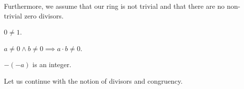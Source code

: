 \documentclass[english]{article}
\begin{document}
  Furthermore, we assume that our ring is not trivial and that there are no non-trivial zero
  divisors.

  \begin{forthel}
    \begin{axiom}\label{NonTriv}
      $0 \neq 1$.
    \end{axiom}

    \begin{axiom}\label{ZeroDiv}
      $a \neq 0 \wedge b \neq 0 \implies a \cdot b \neq 0$.
    \end{axiom}

    \begin{lemma}
      $-(-a)$ is an integer.
    \end{lemma}
  \end{forthel}

  Let us continue with the notion of divisors and congruency.
\end{document}
